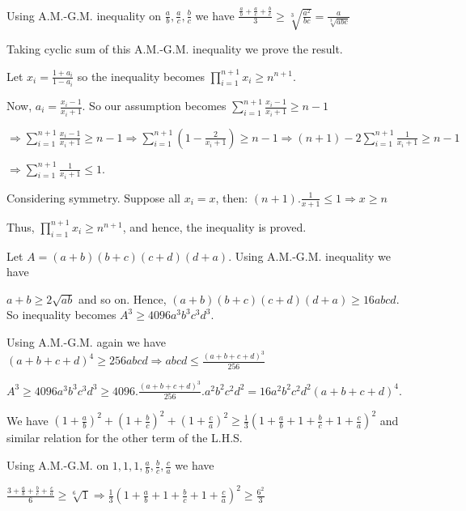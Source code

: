   Using A.M.-G.M. inequality on $\frac{a}{b}, \frac{a}{c}, \frac{b}{c}$ we have
  $\frac{\frac{a}{b} + \frac{a}{c} + \frac{b}{c}}{3}\geq \sqrt[3]{\frac{a^2}{bc}} = \frac{a}{\sqrt[3]{abc}}$

  Taking cyclic sum of this A.M.-G.M. inequality we prove the result.
\item Let $x_i = \frac{1 + a_i}{1 - a_i}$ so the inequality becomes $\displaystyle\prod_{i = 1}^{n + 1}x_i\geq
  n^{n + 1}$.

  Now, $a_i = \frac{x_i - 1}{x_i + 1}$. So our assumption becomes $\displaystyle\sum_{i = 1}^{n + 1}\frac{x_i -
    1}{x_i + 1}\geq n - 1$

  $\Rightarrow \displaystyle\sum_{i = 1}^{n + 1}\frac{x_i - 1}{x_i + 1}\geq n - 1\Rightarrow \sum_{i = 1}^{n
  + 1}\left(1 - \frac{2}{x_i + 1}\right)\geq n - 1\Rightarrow (n + 1) - 2\sum_{i = 1}^{n + 1}\frac{1}{x_i +
    1}\geq n - 1$

  $\Rightarrow \displaystyle\sum_{i = 1}^{n + 1}\frac{1}{x_i + 1}\leq 1$.

  Considering symmetry. Suppose all $x_i = x$, then: $(n + 1).\frac{1}{x + 1}\leq 1\Rightarrow x\geq n$

  Thus, $\displaystyle\prod_{i = 1}^{n + 1}x_i\geq n^{n + 1}$, and hence, the inequality is proved.
\item Let $A = (a+b)(b+c)(c+d)(d+a)$. Using A.M.-G.M. inequality we have

  $a + b\geq 2\sqrt{ab}$ and so on. Hence, $(a+b)(b+c)(c+d)(d+a) \geq 16abcd$. So inequality becomes
  $A^3\geq 4096a^3b^3c^3d^3$.

  Using A.M.-G.M. again we have $(a + b + c + d)^4\geq 256abcd \Rightarrow abcd\leq \frac{(a + b + c +
    d)^3}{256}$

  $A^3\geq 4096a^3b^3c^3d^3\geq 4096.\frac{(a + b + c + d)^3}{256}.a^2b^2c^2d^2 = 16a^2b^2c^2d^2(a + b + c +
  d)^4$.
\item We have $\left(1 + \frac{a}{b}\right)^2 + \left(1 + \frac{b}{c}\right)^2 + \left(1
  + \frac{c}{a}\right)^2\geq \frac{1}{3}\left(1 + \frac{a}{b} + 1 + \frac{b}{c} + 1 + \frac{c}{a}\right)^2$
  and similar relation for the other term of the L.H.S.

  Using A.M.-G.M. on $1, 1, 1, \frac{a}{b}, \frac{b}{c}, \frac{c}{a}$ we have

  $\displaystyle\frac{3 + \frac{a}{b} + \frac{b}{c}
    + \frac{c}{a}}{6}\geq \sqrt[6]{1}\Rightarrow \frac{1}{3}\left(1 + \frac{a}{b} + 1 + \frac{b}{c} + 1
  + \frac{c}{a}\right)^2 \geq \frac{6^2}{3}$

